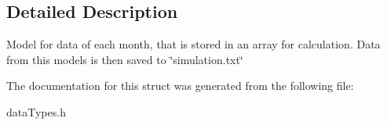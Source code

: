 \subsection{Detailed Description}
Model for data of each month, that is stored in an array for calculation. Data from this models is then saved to \char`\"{}simulation.\+txt\char`\"{} 

The documentation for this struct was generated from the following file\+:\begin{DoxyCompactItemize}
\item 
data\+Types.\+h\end{DoxyCompactItemize}
